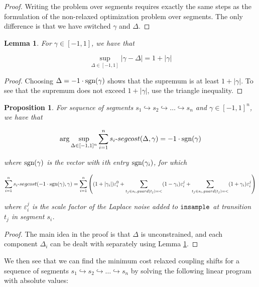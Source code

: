 \documentclass{article}
\newtheorem{proposition}{Proposition}[section]
\newtheorem{lemma}[theorem]{Lemma}
\renewcommand{\epsilon}{\varepsilon}
\newcommand{\sgn}{\textup{sgn}}
\newcommand{\insample}{\textup{\texttt{insample}}}
\newcommand{\1}{\langle 1 \rangle}
\newcommand{\2}{\langle 2 \rangle}
\begin{document}
\begin{proof}
    Writing the problem over segments requires exactly the same steps as the formulation of the non-relaxed optimization problem over segments. The only difference is that we have switched $\gamma$ and $\Delta$. 
\end{proof}

\begin{lemma}
    \label{lemma:solved_delta_relaxed_shifts}
    For $\gamma \in [-1, 1]$, we have that 

    \[\sup_{\Delta \in [-1, 1]} |\gamma - \Delta| = 1 + |\gamma|\]
\end{lemma}

\begin{proof}
    Choosing $\Delta = -1 \cdot \sgn(\gamma)$ shows that the supremum is at least $1 + |\gamma|$. To see that the supremum does not exceed $1 + |\gamma|$, use the triangle inequality.
\end{proof}

\begin{proposition}
    For sequence of segments $s_1 \hookrightarrow s_2 \hookrightarrow \dots \hookrightarrow s_n$ and $\gamma \in [-1, 1]^n$, we have that

    \[\arg \sup_{\Delta \in [-1, 1]^n} \sum_{i = 1}^n s_i\text{-}segcost(\Delta, \gamma) = -1 \cdot \sgn(\gamma)\]

    where $\sgn(\gamma)$ is the vector with $i$th entry $\sgn(\gamma_i)$, for which 

    \[\sum_{i = 1}^n s_i\text{-}segcost(-1 \cdot \sgn(\gamma), \gamma) = \sum_{i = 1}^n \left((1 + |\gamma_i|)\epsilon_i^0 + \sum_{t_j \in s_i, guard(t_j) = <} (1 - \gamma_i) \epsilon_i^j +\sum_{t_j \in s_i, guard(t_j) = <} (1 + \gamma_i) \epsilon_i^j \right) \]

    where $\epsilon_i^j$ is the scale factor of the Laplace noise added to $\insample$ at transition $t_j$ in segment $s_i$.
\end{proposition}

\begin{proof}
    The main idea in the proof is that $\Delta$ is unconstrained, and each component $\Delta_i$ can be dealt with separately using Lemma \ref{lemma:solved_delta_relaxed_shifts}. 
\end{proof}

We then see that we can find the minimum cost relaxed coupling shifts for a sequence of segments $s_1 \hookrightarrow s_2 \hookrightarrow \dots \hookrightarrow s_n$ by solving the following linear program with absolute values: 
\end{document}
